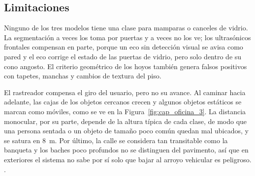 \subsection{Limitaciones}

Ninguno de los tres modelos tiene una clase para mamparas o canceles de vidrio. La
segmentación a veces los toma por puertas y a veces no los ve; los ultrasónicos
frontales compensan en parte, porque un eco sin detección visual se avisa como pared y
el eco corrige el estado de las puertas de vidrio, pero solo dentro de su cono angosto.
El criterio geométrico de los hoyos también genera falsos positivos con tapetes,
manchas y cambios de textura del piso.

El rastreador compensa el giro del usuario, pero no su avance. Al caminar hacia
adelante, las cajas de los objetos cercanos crecen y algunos objetos estáticos se marcan
como móviles, como se ve en la Figura~\ref{fig:cap_oficina_3}. La distancia monocular,
por su parte, depende de la altura típica de cada clase, de modo que una persona sentada
o un objeto de tamaño poco común quedan mal ubicados, y se satura en 8~m. Por último, la
calle se considera tan transitable como la banqueta y los baches poco profundos no se
distinguen del pavimento, así que en exteriores el sistema no sabe por sí solo que bajar
al arroyo vehicular es peligroso. .
